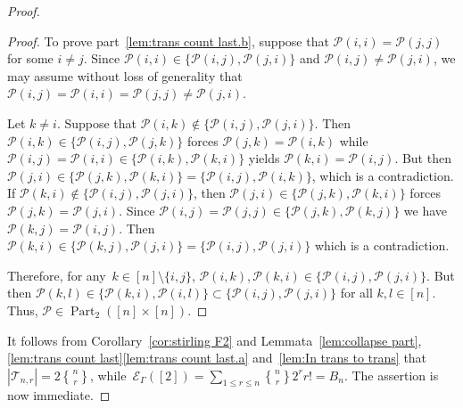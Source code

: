\documentclass[10pt,a4paper]{amsart}
\DeclareMathOperator{\Part}{Part}
\newcommand{\tstirling}[2]{\genfrac{\{}{\}}{0pt}1{#1}{#2}}
\begin{document}
\begin{proof}
\begin{proof}
To prove part~\ref{lem:trans count last.b}, suppose that
$\mathcal P(i,i)=\mathcal P(j,j)$ for some $i\not=j$.
Since $\mathcal P(i,i)\in\{\mathcal P(i,j),\mathcal P(j,i)\}$
and $\mathcal P(i,j)\not=\mathcal P(j,i)$, we may assume without loss of generality that $\mathcal P(i,j)=\mathcal P(i,i)=\mathcal P(j,j)\not=\mathcal P(j,i)$.

Let $k\not=i$. 
Suppose that $\mathcal P(i,k)\notin\{\mathcal P(i,j),\mathcal P(j,i)\}$. Then $\mathcal P(i,k)\in\{\mathcal P(i,j),\mathcal P(j,k)\}$
forces $\mathcal P(j,k)=\mathcal P(i,k)$ while $\mathcal P(i,j)=\mathcal P(i,i)\in\{\mathcal P(i,k),\mathcal P(k,i)\}$ yields $\mathcal P(k,i)=\mathcal P(i,j)$.
But then $\mathcal P(j,i)\in\{\mathcal P(j,k),\mathcal P(k,i)\}=\{\mathcal P(i,j),
\mathcal P(i,k)\}$, which is a contradiction.
If $\mathcal P(k,i)\notin\{\mathcal P(i,j),\mathcal P(j,i)\}$, then
$\mathcal P(j,i)\in\{\mathcal P(j,k),\mathcal P(k,i)\}$ forces $\mathcal P(j,k)=\mathcal P(j,i)$.
Since $\mathcal P(i,j)=\mathcal P(j,j)\in\{\mathcal P(j,k),\mathcal P(k,j)\}$ we have $\mathcal P(k,j)=\mathcal P(i,j)$. Then $\mathcal P(k,i)\in\{\mathcal P(k,j),\mathcal P(j,i)\}
=\{\mathcal P(i,j),\mathcal P(j,i)\}$ which is a contradiction. 

Therefore, for any~$k\in[n]\setminus\{i,j\}$, $\mathcal P(i,k),\mathcal P(k,i)\in \{\mathcal P(i,j),\mathcal P(j,i)\}$.
But then $\mathcal P(k,l)\in\{\mathcal P(k,i),\mathcal P(i,l)\}\subset \{\mathcal P(i,j),\mathcal P(j,i)\}$ for all $k,l\in [n]$. Thus, $\mathcal P\in\Part_2([n]\times[n])$. 
\end{proof}
It follows from Corollary~\ref{cor:stirling F2} and Lemmata~\ref{lem:collapse part}, \ref{lem:trans count last}\ref{lem:trans count last.a} and~\ref{lem:In trans to trans} that~$|\mathscr T_{n,r}|=2\tstirling{n}{r}$,
while~$\mathcal E_{\Gamma}([2])=\sum_{1\le r\le n}\tstirling{n}{r}2^r r!=B_n$. The assertion is now immediate.
\end{proof}
\end{document}
